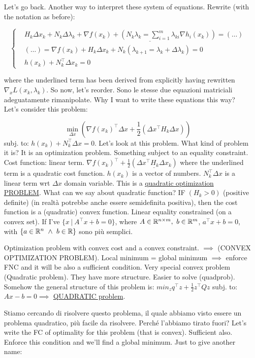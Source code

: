 Let's go back. Another way to interpret these system of equations. Rewrite (with the notation as before):

\[
	\left\{
	\begin{aligned}
	&H_k\Delta x_k + N_k\Delta\lambda_k + \underline{\nabla{f(x_k)} + (N_k\lambda_k = \sum_{i=1}^m{\lambda_{ki}\nabla{h_i(x_k)}})} = (\dots)\\
	&(\dots) = \nabla{f(x_k)} + H_k\Delta x_k + N_k(\lambda_{k+1} = \lambda_k+\Delta\lambda_k) = 0\\
	&h(x_k) + N_k^\top\Delta x_k = 0
	\end{aligned}
	\right.
\]

where the underlined term has been derived from explicitly having rewritten $\nabla_x{L(x_k,\lambda_k)}$. So now, let's reorder. Sono le stesse due equazioni matriciali adeguatamente rimanipolate. Why I want to write these equations this way? Let's consider this problem:

\[
	\min_{\Delta x}{(\nabla{f(x_k)}^\top\Delta x + \frac{1}{2}(\Delta x^\top H_k\Delta x))}
\]
subj. to: $h(x_k) + N_k^\top\Delta x = 0$.
Let's look at this problem. What kind of problem it is? It is an optimization problem. Something subject to an equality constraint. Cost function: linear term. $\nabla{f(x_k)}^\top + \frac{1}{2}(\underline{\Delta x^\top H_k\Delta x_k})$ where the underlined term is a quadratic cost function. $h(x_k)$ is a vector of numbers. $N_k^\top\Delta x$ is a linear term wrt $\Delta x$ domain variable. This is a \underline{quadratic optimization PROBLEM}. What can we say about quadratic function? IF $(H_k>0)$ (positive definite) (in realtà potrebbe anche essere semidefinita positiva), then the cost function is a (quadratic) convex function. Linear equality constrained (on a convex set). If I've $\{x\ |\ A^\top x+b = 0\}$, where $A\in\mathbb{R}^{n\times m},\ b\in\mathbb{R}^m$, $a^\top x +b=0$, with $\{a\in\mathbb{R}^n\ \land\ b\in\mathbb{R}\}$ sono più semplici.

Optimization problem with convex cost and a convex constraint. $\implies$ (CONVEX OPTIMIZATION PROBLEM). Local minimum = global minimum $\implies$ enforce FNC and it will be also a sufficient condition. Very special convex problem (Quadratic problem). They have more structure. Easier to solve (quadprob).
Somehow the general structure of this problem is: $min_z{q^\top z + \frac{1}{2}z^\top Qz}$ subj. to: $Ax-b=0 \implies$ \underline{QUADRATIC problem}. 

Stiamo cercando di risolvere questo problema, il quale abbiamo visto essere un problema quadratico, più facile da risolvere. Perché l'abbiamo tirato fuori? Let's write the FC of optimality for this problem (that is convex). Sufficient also. Enforce this condition and we'll find a global minimum. Just to give another name:

